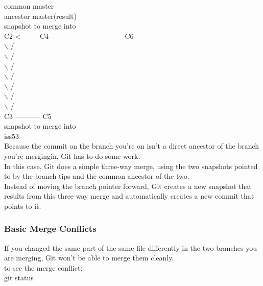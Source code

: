 \documentclass[11pt]{article}
\begin{document}
common            master\\
ancestor     	      			      		 master(result)\\
                                  snapshot to merge into\\
 C2  <-------    	C4   ------------------------------ C6\\
                            $\backslash$ 	   	       	 	    /\\
                       $\backslash$	   	     		   /\\
                        $\backslash$	   	     		  /\\
                         $\backslash$       	   		 /\\
                                 $\backslash$  	  	       	/\\
                                 $\backslash$     	      	       /\\
                                  $\backslash$    	              /\\
                                     C3 -----------  C5\\
                                                       snapshot to merge into\\

iss53\\

Because the commit on the branch you're on isn't a direct ancestor of the branch you're mergingin, Git has to do some work.\\
In this case, Git does a simple three-way merge, using the two snapshots pointed to by the branch tips and the common ancestor of the two.\\
Instead of moving the branch pointer forward, Git creates a new snapshot that results from this three-way merge and automatically creates a new commit that points to it.\\

\subsubsection{Basic Merge Conflicts}
\label{sec:org479ef4b}

If you changed the same part of the same file differently in the two branches you are merging, Git won't be able to merge them cleanly.\\

to see the merge conflict:\\
git status\\
\end{document}
